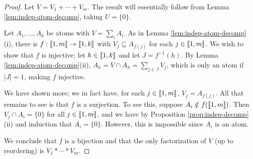 \begin{proof}
Let $V = V_1+\cdots + V_m$.
The result will essentially follow from Lemma \ref{lem:indep-atom-decomp}, taking $U = \{0\}$.

Let $A_1,\dots, A_k$ be atoms with $V = \sum_i A_i$.
As in Lemma \ref{lem:indep-atom-decomp}(i), there is $f:\llbracket 1,m \rrbracket \to \llbracket 1,k\rrbracket$ with $V_j \subseteq A_{f(j)}$ for each $j\in \llbracket 1,m\rrbracket$.
We wish to show that $f$ is injective; let $h\in \llbracket 1,k \rrbracket$ and let $J = f^{-1}(h)$.
By Lemma \ref{lem:indep-atom-decomp}(ii), $A_h = V \cap A_h = \sum_{j\in J} V_j$, which is only an atom if $|J|=1$, making $f$ injective.  

We have shown more; we in fact have, for each $j\in \llbracket 1,m \rrbracket$, $V_j = A_{f(j)}$.
All that remains to see is that $f$ is a surjection.
To see this, suppose $A_i \notin f(\llbracket 1,m \rrbracket)$.
Then $V_j \cap A_i = \{0\}$ for all $j\in  \llbracket 1,m \rrbracket$, and we have by Proposition \ref{prop:indep-decomp}(ii) and induction that $A_i = \{0\}$.
However, this is impossible since $A_i$ is an atom.  

We conclude that $f$ is a bijection and that the only factorization of $V$ (up to reordering) is $V_1*\cdots*V_m$.
\end{proof}

